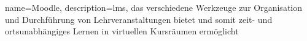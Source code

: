 {
        name=Moodle,
        description={\acrfull{lms}, das verschiedene Werkzeuge zur Organisation und Durchführung von Lehrveranstaltungen bietet und somit zeit- und ortsunabhängiges Lernen in virtuellen Kursräumen ermöglicht \cite{HsH.ELC}} %
}
